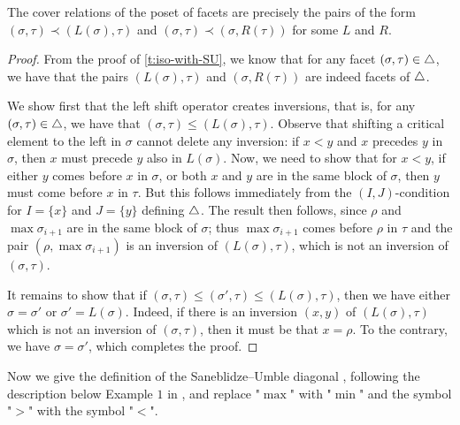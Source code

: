 \begin{proposition}
    \label{p:cover-relations}
    The cover relations of the poset of facets are precisely the pairs of the form $(\sigma,\tau) \prec (L(\sigma),\tau)$ and $(\sigma,\tau) \prec (\sigma,R(\tau))$ for some $L$ and $R$. 
\end{proposition}

\begin{proof} 
From the proof of \cref{t:iso-with-SU}, we know that for any facet $(\sigma,\tau) \in \triangle$, we have that the pairs $(L(\sigma),\tau)$ and $(\sigma,R(\tau))$ are indeed facets of $\triangle$. 

We show first that the left shift operator creates inversions, that is, for any $(\sigma, \tau) \in \triangle$, we have that $(\sigma,\tau) \leq (L(\sigma),\tau)$. 
Observe that shifting a critical element to the left in $\sigma$ cannot delete any inversion: if $x<y$ and $x$ precedes $y$ in $\sigma$, then $x$ must precede $y$ also in $L(\sigma)$. 
Now, we need to show that for $x<y$, if either $y$ comes before $x$ in $\sigma$, or both $x$ and $y$ are in the same block of $\sigma$, then $y$ must come before $x$ in $\tau$. 
But this follows immediately from the $(I,J)$-condition for $I=\{x\}$ and $J=\{y\}$ defining $\triangle$. 
The result then follows, since $\rho$ and $\max \sigma_{i+1}$ are in the same block of $\sigma$; thus $\max \sigma_{i+1}$ comes before $\rho$ in $\tau$ and the pair $(\rho,\max \sigma_{i+1})$ is an inversion of $(L(\sigma),\tau)$, which is not an inversion of $(\sigma,\tau)$. 

It remains to show that if $(\sigma,\tau) \leq (\sigma',\tau) \leq (L(\sigma),\tau)$, then we have either $\sigma=\sigma'$ or $\sigma'=L(\sigma)$. 
Indeed, if there is an inversion $(x,y)$ of $(L(\sigma),\tau)$ which is not an inversion of $(\sigma,\tau)$, then it must be that $x=\rho$. 
To the contrary, we have $\sigma=\sigma'$, which completes the proof. 
\end{proof}

Now we give the definition of the Saneblidze--Umble diagonal \cite{SaneblidzeUmble04}, following the description below Example $1$ in \cite{saneblidzeComparingDiagonalsAssociahedra2022}, and replace "$\max$" with "$\min$" and the symbol "$>$" with the symbol "$<$".

